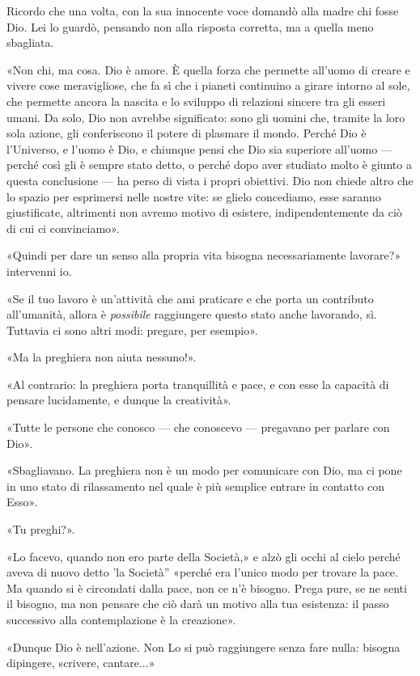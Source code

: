 \documentclass[a4paper,12pt]{book}
\begin{document}
Ricordo che una volta, con la sua innocente voce domandò alla madre chi fosse
Dio. Lei lo guardò, pensando non alla risposta corretta, ma a quella meno
sbagliata.

«Non chi, ma cosa. Dio è amore. È quella forza che permette all'uomo di creare
e vivere cose meravigliose, che fa sì che i pianeti continuino a girare intorno
al sole, che permette ancora la nascita e lo sviluppo di relazioni sincere tra
gli esseri umani. Da solo, Dio non avrebbe significato: sono gli uomini che,
tramite la loro sola azione, gli conferiscono il potere di plasmare il mondo.
Perché Dio è l'Universo, e l'uomo è Dio, e chiunque pensi che Dio sia superiore
all'uomo --- perché così gli è sempre stato detto, o perché dopo aver studiato
molto è giunto a questa conclusione --- ha perso di vista i propri obiettivi.
Dio non chiede altro che lo spazio per esprimersi nelle nostre vite: se glielo
concediamo, esse saranno giustificate, altrimenti non avremo motivo di esistere,
indipendentemente da ciò di cui ci convinciamo».

«Quindi per dare un senso alla propria vita bisogna necessariamente lavorare?»
intervenni io.

«Se il tuo lavoro è un'attività che ami praticare e che porta un contributo
all'umanità, allora è \emph{possibile} raggiungere questo stato anche lavorando,
sì. Tuttavia ci sono altri modi: pregare, per esempio».

«Ma la preghiera non aiuta nessuno!».

«Al contrario: la preghiera porta tranquillità e pace, e con esse la capacità
di pensare lucidamente, e dunque la creatività».

«Tutte le persone che conosco --- che conoscevo --- pregavano per parlare con
Dio».

«Sbagliavano. La preghiera non è un modo per comunicare con Dio, ma ci pone in
uno stato di rilassamento nel quale è più semplice entrare in contatto con
Esso».

«Tu preghi?».

«Lo facevo, quando non ero parte della Società,» e alzò gli occhi al cielo
perché aveva di nuovo detto 'la Società'' «perché era l'unico modo per trovare
la pace. Ma quando si è circondati dalla pace, non ce n'è bisogno. Prega pure,
se ne senti il bisogno, ma non pensare che ciò darà un motivo alla tua
esistenza: il passo successivo alla contemplazione è la creazione».

«Dunque Dio è nell'azione. Non Lo si può raggiungere senza fare nulla: bisogna
dipingere, scrivere, cantare...»
\end{document}
